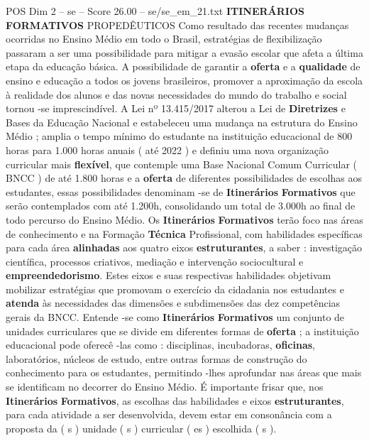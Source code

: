 \begin{textsample}{POS Dim 2 – se – Score 26.00 – se/se\_em\_21.txt}  \label{ex:f2_pos_025}
\textbf{ITINERÁRIOS} \textbf{FORMATIVOS} PROPEDÊUTICOS Como resultado das recentes mudanças ocorridas no Ensino Médio em todo o Brasil, estratégias de flexibilização passaram a ser uma possibilidade para mitigar a evasão escolar que afeta a última etapa da educação básica.
A possibilidade de garantir a \textbf{oferta} e a \textbf{qualidade} de ensino e educação a todos os jovens brasileiros, promover a aproximação da escola à realidade dos alunos e das novas necessidades do mundo do trabalho e social tornou -se imprescindível.
A Lei nº 13.415/2017 alterou a Lei de \textbf{Diretrizes} e Bases da Educação Nacional e estabeleceu uma mudança na estrutura do Ensino Médio ; amplia o tempo mínimo do estudante na instituição educacional de 800 horas para 1.000 horas anuais ( até 2022 ) e definiu uma nova organização curricular mais \textbf{flexível}, que contemple uma Base Nacional Comum Curricular ( BNCC ) de até 1.800 horas e a \textbf{oferta} de diferentes possibilidades de escolhas aos estudantes, essas possibilidades denominam -se de \textbf{Itinerários} \textbf{Formativos} que serão contemplados com até 1.200h, consolidando um total de 3.000h ao final de todo percurso do Ensino Médio.
Os \textbf{Itinerários} \textbf{Formativos} terão foco nas áreas de conhecimento e na Formação \textbf{Técnica} Profissional, com habilidades específicas para cada área \textbf{alinhadas} aos quatro eixos \textbf{estruturantes}, a saber : investigação científica, processos criativos, mediação e intervenção sociocultural e \textbf{empreendedorismo}.
Estes eixos e suas respectivas habilidades objetivam mobilizar estratégias que promovam o exercício da cidadania nos estudantes e \textbf{atenda} às necessidades das dimensões e subdimensões das dez competências gerais da BNCC.
Entende -se como \textbf{Itinerários} \textbf{Formativos} um conjunto de unidades curriculares que se divide em diferentes formas de \textbf{oferta} ; a instituição educacional pode oferecê -las como : disciplinas, incubadoras, \textbf{oficinas}, laboratórios, núcleos de estudo, entre outras formas de construção do conhecimento para os estudantes, permitindo -lhes aprofundar nas áreas que mais se identificam no decorrer do Ensino Médio.
É importante frisar que, nos \textbf{Itinerários} \textbf{Formativos}, as escolhas das habilidades e eixos \textbf{estruturantes}, para cada atividade a ser desenvolvida, devem estar em consonância com a proposta da ( s ) unidade ( s ) curricular ( es ) escolhida ( s ).

\end{textsample}
